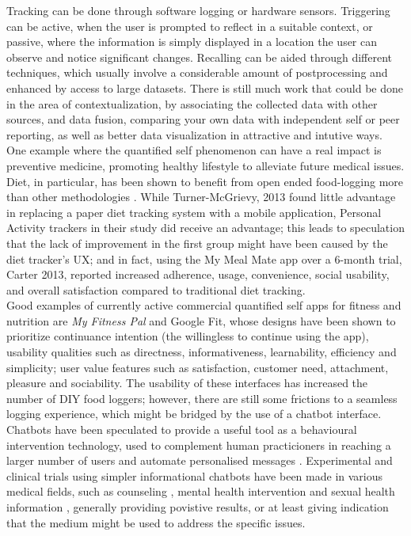 Tracking can be done through software logging or hardware sensors. Triggering can be active, when the user is prompted to reflect in a suitable context, or passive, where the information is simply displayed in a location the user can observe and notice significant changes. Recalling can be aided through different techniques, which usually involve a considerable amount of postprocessing and enhanced by access to large datasets. There is still much work that could be done in the area of contextualization, by associating the collected data with other sources, and data fusion, comparing your own data with independent self or peer reporting, as well as better data visualization in attractive and intutive ways. \\
One example where the quantified self phenomenon can have a real impact is preventive medicine, promoting healthy lifestyle to alleviate future medical issues. Diet, in particular, has been shown to benefit from open ended food-logging more than other methodologies \cite{Bingham1994}. While Turner-McGrievy, 2013 \cite{doi:10.1136/amiajnl-2012-001510} found little advantage in replacing a paper diet tracking system with a mobile application, Personal Activity trackers in their study did receive an advantage; this leads to speculation that the lack of improvement in the first group might have been caused by the diet tracker's UX; and in fact, using the My Meal Mate app over a 6-month trial, Carter 2013, \cite{carter2013adherence} reported increased adherence, usage, convenience, social usability, and overall satisfaction compared to traditional diet tracking. \\
Good examples of currently active commercial quantified self apps for fitness and nutrition are \textit{My Fitness Pal}\cite{mfpwebsite} and Google Fit\cite{googlefitwebsite}, whose designs have been shown \cite{Suzianti2017} to prioritize continuance intention (the willingless to continue using the app), usability qualities such as directness, informativeness, learnability, efficiency and simplicity; user value features such as satisfaction, customer need, attachment, pleasure and sociability. The usability of these interfaces has increased the number of DIY food loggers\cite{Alonso2015}; however, there are still some frictions to a seamless logging experience\cite{Brixey2017}, which might be bridged by the use of a chatbot interface.  \\
Chatbots have been speculated to provide a useful tool as a behavioural intervention technology, used to complement human practicioners in reaching a larger number of users and automate personalised messages \cite{Gabrielli2017}. Experimental and clinical trials using simpler informational chatbots have been made in various medical fields, such as counseling \cite{Cameron}, mental health intervention \cite{Elmasri2012} and sexual health information \cite{Brixey2017}, generally providing povistive results, or at least giving indication that the medium might be used to address the specific issues.
